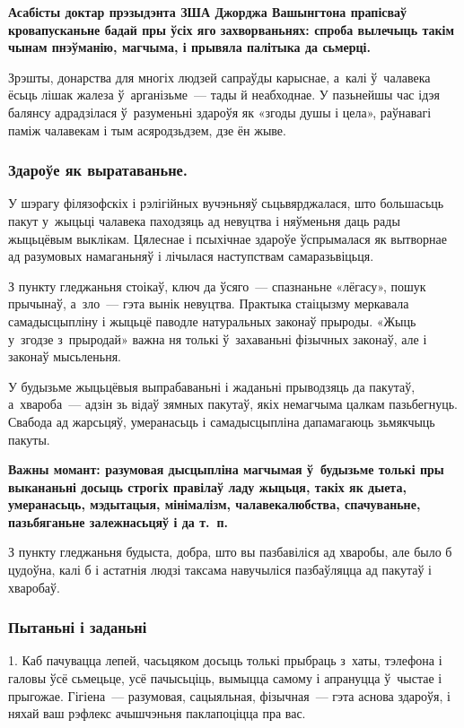 \textbf{Асабісты доктар прэзыдэнта ЗША Джорджа Вашынгтона прапісваў кровапусканьне бадай пры ўсіх яго захворваньнях: спроба вылечыць такім чынам пнэўманію, магчыма, і прывяла палітыка да сьмерці.} 

Зрэшты, донарства для многіх людзей сапраўды карыснае, а~калі ў~чалавека ёсьць лішак жалеза ў~арганізьме~--- тады й неабходнае. У пазьнейшы час ідэя балянсу адрадзілася ў~разуменьні здароўя як «згоды душы і цела», раўнавагі паміж чалавекам і тым асяродзьдзем, дзе ён жыве.

\subsubsection{Здароўе як выратаваньне.} 

У шэрагу філязофскіх і рэлігійных вучэньняў сьцьвярджалася, што большасьць пакут у~жыцьці чалавека паходзяць ад невуцтва і няўменьня даць рады жыцьцёвым выклікам. Цялеснае і псыхічнае здароўе ўспрымалася як вытворнае ад разумовых намаганьняў і лічылася наступствам самаразьвіцьця.

З пункту гледжаньня стоікаў, ключ да ўсяго~--- спазнаньне «лёгасу», пошук прычынаў, а~зло~--- гэта вынік невуцтва. Практыка стаіцызму меркавала самадысцыпліну і жыцьцё паводле натуральных законаў прыроды. «Жыць у~згодзе з~прыродай» важна ня толькі ў~захаваньні фізычных законаў, але і законаў мысьленьня.

У будызьме жыцьцёвыя выпрабаваньні і жаданьні прыводзяць да пакутаў, а~хвароба~--- адзін зь відаў зямных пакутаў, якіх немагчыма цалкам пазьбегнуць. Свабода ад жарсьцяў, умеранасьць і самадысцыпліна дапамагаюць зьмякчыць пакуты.

\textbf{Важны момант: разумовая дысцыпліна магчымая ў~будызьме толькі пры выкананьні досыць строгіх правілаў ладу жыцьця, такіх як дыета, умеранасьць, мэдытацыя, мінімалізм, чалавекалюбства, спачуваньне, пазьбяганьне залежнасьцяў і да т.~п.} 

З пункту гледжаньня будыста, добра, што вы пазбавіліся ад хваробы, але было б цудоўна, калі б і астатнія людзі таксама навучыліся пазбаўляцца ад пакутаў і хваробаў.

\subsubsection{Пытаньні і заданьні}

1. Каб пачувацца лепей, часьцяком досыць толькі прыбраць з~хаты, тэлефона і галовы ўсё сьмецьце, усё пачысьціць, вымыцца самому і апрануцца ў~чыстае і прыгожае. Гігіена~--- разумовая, сацыяльная, фізычная~--- гэта аснова здароўя, і няхай ваш рэфлекс ачышчэньня паклапоціцца пра вас.

